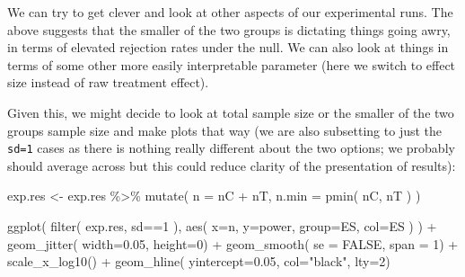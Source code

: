 \documentclass[
]{book}
\newenvironment{Shaded}{\begin{snugshade}}{\end{snugshade}}
\newcommand{\AttributeTok}[1]{\textcolor[rgb]{0.77,0.63,0.00}{#1}}
\newcommand{\ConstantTok}[1]{\textcolor[rgb]{0.00,0.00,0.00}{#1}}
\newcommand{\DecValTok}[1]{\textcolor[rgb]{0.00,0.00,0.81}{#1}}
\newcommand{\FloatTok}[1]{\textcolor[rgb]{0.00,0.00,0.81}{#1}}
\newcommand{\FunctionTok}[1]{\textcolor[rgb]{0.00,0.00,0.00}{#1}}
\newcommand{\NormalTok}[1]{#1}
\newcommand{\OtherTok}[1]{\textcolor[rgb]{0.56,0.35,0.01}{#1}}
\newcommand{\SpecialCharTok}[1]{\textcolor[rgb]{0.00,0.00,0.00}{#1}}
\newcommand{\StringTok}[1]{\textcolor[rgb]{0.31,0.60,0.02}{#1}}
\begin{document}
We can try to get clever and look at other aspects of our experimental runs.
The above suggests that the smaller of the two groups is dictating things
going awry, in terms of elevated rejection rates under the null. We can also
look at things in terms of some other more easily interpretable parameter
(here we switch to effect size instead of raw treatment effect).

Given this, we might decide to look at total sample size or the smaller of
the two groups sample size and make plots that way (we are also subsetting to
just the \texttt{sd=1} cases as there is nothing really different about the two
options; we probably should average across but this could reduce clarity of
the presentation of results):

\begin{Shaded}
\begin{Highlighting}[]
\NormalTok{exp.res }\OtherTok{\textless{}{-}}\NormalTok{ exp.res }\SpecialCharTok{\%\textgreater{}\%} \FunctionTok{mutate}\NormalTok{( }\AttributeTok{n =}\NormalTok{ nC }\SpecialCharTok{+}\NormalTok{ nT,}
                               \AttributeTok{n.min =} \FunctionTok{pmin}\NormalTok{( nC, nT ) )}
\end{Highlighting}
\end{Shaded}

\begin{Shaded}
\begin{Highlighting}[]
\FunctionTok{ggplot}\NormalTok{( }\FunctionTok{filter}\NormalTok{( exp.res, sd}\SpecialCharTok{==}\DecValTok{1}\NormalTok{ ), }\FunctionTok{aes}\NormalTok{( }\AttributeTok{x=}\NormalTok{n, }\AttributeTok{y=}\NormalTok{power, }\AttributeTok{group=}\NormalTok{ES, }\AttributeTok{col=}\NormalTok{ES ) ) }\SpecialCharTok{+}
  \FunctionTok{geom\_jitter}\NormalTok{( }\AttributeTok{width=}\FloatTok{0.05}\NormalTok{, }\AttributeTok{height=}\DecValTok{0}\NormalTok{) }\SpecialCharTok{+}
  \FunctionTok{geom\_smooth}\NormalTok{( }\AttributeTok{se =} \ConstantTok{FALSE}\NormalTok{, }\AttributeTok{span =} \DecValTok{1}\NormalTok{) }\SpecialCharTok{+}
  \FunctionTok{scale\_x\_log10}\NormalTok{() }\SpecialCharTok{+}
  \FunctionTok{geom\_hline}\NormalTok{( }\AttributeTok{yintercept=}\FloatTok{0.05}\NormalTok{, }\AttributeTok{col=}\StringTok{"black"}\NormalTok{, }\AttributeTok{lty=}\DecValTok{2}\NormalTok{)}
\end{Highlighting}
\end{Shaded}
\end{document}
